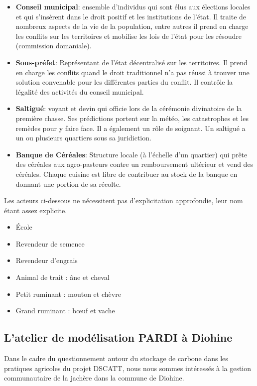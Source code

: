 \begin{itemize}
  \item \textbf{Conseil municipal}: ensemble d'individus qui sont élus aux élections locales et qui s'insèrent dans le droit positif et les institutions de l'état. Il traite de nombreux aspects de la vie de la population, entre autres il prend en charge les conflits sur les territoires et mobilise les lois de l'état pour les résoudre  (commission domaniale).
  \item \textbf{Sous-préfet}: Représentant de l'état décentralisé sur les territoires. Il prend en charge les conflits quand le droit traditionnel n'a pas réussi à trouver une solution convenable pour les différentes parties du conflit. Il contrôle la légalité des activités du conseil municipal.
  \item \textbf{Saltigué}: voyant et devin qui officie lors de la cérémonie divinatoire de la première chasse. Ses prédictions portent sur la météo, les catastrophes et les remèdes pour y faire face. Il a également un rôle de soignant. Un saltigué a un ou plusieurs quartiers sous sa juridiction.
  \item \textbf{Banque de Céréales}: Structure locale (à l'échelle d'un quartier) qui prête des céréales aux agro-pasteurs contre un remboursement ultérieur et vend des céréales. Chaque cuisine est libre de contribuer au stock de la banque en donnant une portion de sa récolte.
\end{itemize}



Les acteurs ci-dessous ne nécessitent pas d'explicitation approfondie, leur nom étant assez explicite.

\begin{itemize}
\item École
\item Revendeur de semence
\item Revendeur d'engrais
\item Animal de trait : âne et cheval
\item Petit ruminant : mouton et chèvre
\item Grand ruminant : bœuf et vache
\end{itemize}

\subsection{L'atelier de modélisation PARDI à Diohine }

Dans le cadre du questionnement autour du stockage de carbone dans les pratiques agricoles du projet DSCATT, nous nous sommes intéressés à la gestion communautaire de la jachère dans la commune de Diohine.

